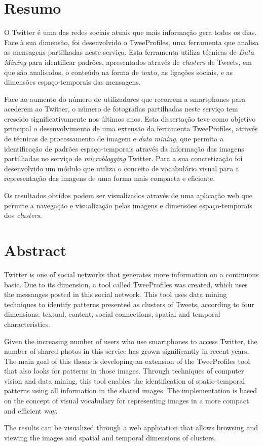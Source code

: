 \chapter*{Resumo}

O Twitter é uma das redes sociais atuais que mais informação gera todos os dias. Face à sua dimensão, foi desenvolvido o TweeProfiles, uma ferramenta que analisa as mensagens partilhadas neste serviço. Esta ferramenta utiliza técnicas de \textit{Data Mining} para identificar padrões, apresentados através de \textit{clusters} de Tweets, em que são analisados, o conteúdo na forma de texto, as ligações sociais, e as dimensões espaço-temporais das mensagens.

Face ao aumento do número de utilizadores que recorrem a smartphones para acederem ao Twitter, o número de fotografias partilhadas neste serviço tem crescido significativamente nos últimos anos. Esta dissertação teve como objetivo principal o desenvolvimento de uma extensão da ferramenta TweeProfiles, através de técnicas de processamento de imagem e \textit{data mining}, que permita a identificação de padrões espaço-temporais através da informação das imagens partilhadas no serviço de \textit{microblogging} Twitter. Para a sua concretização foi desenvolvido um módulo que utiliza o conceito de vocabulário visual para a representação das imagens de uma forma mais compacta e eficiente. 


Os resultados obtidos podem ser visualizados através de uma aplicação web que permite a navegação e visualização pelas imagens e dimensões espaço-temporais dos \textit{clusters}.

\chapter*{Abstract}

Twitter is one of social networks that generates more information on a continuous basic. Due to its dimension, a tool called TweeProfiles was created, which uses the messanges posted in this social network. This tool uses data mining techniques to identify patterns presented as clusters of Tweets, according to four dimensions: textual,  content, social connections, spatial and temporal characteristics.

Given the increasing number of users who use smartphones to access Twitter, the number of shared photos in this service has grown significantly in recent years. The main goal of this thesis is developing an extension of the TweeProfiles tool that also looks for patterns in those images. Through techniques of computer vision and data mining, this tool enables the identification of spatio-temporal patterns using all information in the shared images. The implementation is based on the concept of visual vocabulary for representing images in a more compact and efficient way.

The results can be visualized through a web application that allows browsing and viewing the images and spatial and temporal dimensions of clusters. 

